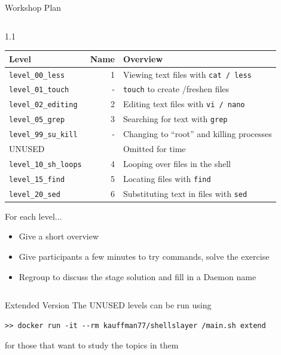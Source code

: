 \documentclass[mathserif]{beamer}
\begin{document}
\begin{frame}[label={sec:org94daccc},fragile]{Workshop Plan}
 \vspace{-.4in}
\begin{columns}
\begin{column}{1.1\columnwidth}
\begin{block}{}
\normalsize
\begin{center}
\begin{tabular}{lrl}
\hline
Level & Name & Overview\\
\hline
\texttt{level\_00\_less} & 1 & Viewing text files with \texttt{cat / less}\\
\texttt{level\_01\_touch} & - & \texttt{touch} to create /freshen files\\
\texttt{level\_02\_editing} & 2 & Editing text files with \texttt{vi / nano}\\
\texttt{level\_05\_grep} & 3 & Searching for text with \texttt{grep}\\
\texttt{level\_99\_su\_kill} & - & Changing to ``root'' and killing processes\\
\hline
UNUSED &  & Omitted for time\\
\texttt{level\_10\_sh\_loops} & 4 & Looping over files in the shell\\
\texttt{level\_15\_find} & 5 & Locating files with \texttt{find}\\
\texttt{level\_20\_sed} & 6 & Substituting text in files with \texttt{sed}\\
\hline
\end{tabular}
\end{center}

\normalsize

For each level...
\begin{itemize}
\item Give a short overview
\item Give participants a few minutes to try commands, solve the exercise
\item Regroup to discuss the stage solution and fill in a Daemon name
\end{itemize}
\end{block}
\end{column}
\end{columns}
\end{frame}
\begin{frame}[label={sec:orga642304},fragile]{Extended Version}
 The UNUSED levels can be run using
\fontsize{8}{9}
\begin{verbatim}
>> docker run -it --rm kauffman77/shellslayer /main.sh extend
\end{verbatim}
\normalsize
for those that want to study the topics in them
\end{frame}
\end{document}

